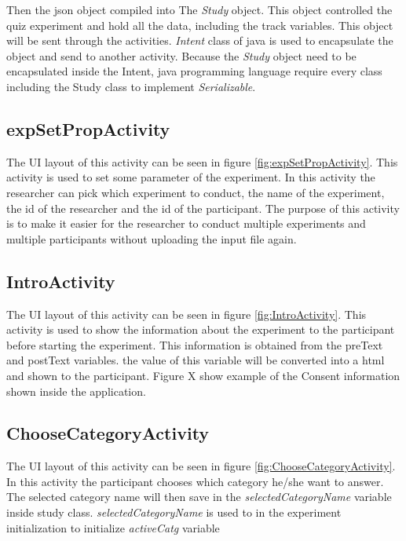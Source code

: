 Then the json object compiled into The \textit{Study} object. This object controlled the quiz experiment and hold all the data, including the track variables.
This object will be sent through the activities.
\textit{Intent} class of java is used to encapsulate the object and send to another activity.
Because the \textit{Study} object need to be encapsulated inside the Intent,
 java programming language require every class including the Study class to implement \textit{Serializable}.

%

\subsection{expSetPropActivity}
The UI layout of this activity can be seen in figure \ref{fig:expSetPropActivity}.
This activity is used to set some parameter of the experiment. In this activity the researcher can pick which experiment to conduct, the name of the experiment,
the id of the researcher and the id of the participant.
The purpose of this activity is to make it easier for the researcher to conduct multiple experiments and multiple participants without uploading the input file again.

\subsection{IntroActivity}
The UI layout of this activity can be seen in figure \ref{fig:IntroActivity}.
This activity is used to show the information about the experiment to the participant before starting the experiment.
This information is obtained from the preText and postText variables. the value of this variable will be converted into a html and shown to the participant.
Figure X show example of the Consent information shown inside the application.

\subsection{ChooseCategoryActivity}
The UI layout of this activity can be seen in figure \ref{fig:ChooseCategoryActivity}.
In this activity the participant chooses which category he/she want to answer.
The selected category name will then save in the \textit{selectedCategoryName} variable inside study class.
\textit{selectedCategoryName} is used to in the experiment initialization to initialize \textit{activeCatg} variable


